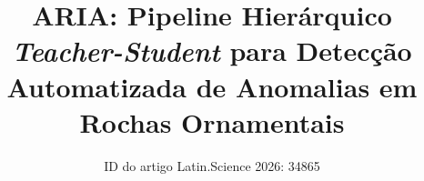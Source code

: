 \documentclass[10pt,conference]{IEEEtran}
\begin{document}
\title{ARIA: Pipeline Hierárquico \textit{Teacher-Student} para Detecção Automatizada de Anomalias em Rochas Ornamentais}

\newif\iffinal
\finalfalse
\newcommand{\blind}[2]{\iffinal#2\else#1\fi}
\newcommand{\cmtid}{34865}

\iffinal
\author{
\IEEEauthorblockN{Henrique Machado de Oliveira}
\IEEEauthorblockA{Instituto Federal do\\Espírito Santo (IFES)\\
Cachoeiro de Itapemirim, Brasil\\
rikemachado999@gmail.com}
\and
\IEEEauthorblockN{Rafael Silva Guimarães}
\IEEEauthorblockA{Instituto Federal do\\Espírito Santo (IFES)\\
Cachoeiro de Itapemirim, Brasil\\
rafaelg@ifes.edu.br}
\and
\IEEEauthorblockN{Everson Scherrer Borges}
\IEEEauthorblockA{Instituto Federal do\\Espírito Santo (IFES)\\
Cachoeiro de Itapemirim, Brasil\\
eversonborges@gmail.com}}
\else
  \author{ID do artigo Latin.Science 2026: \cmtid \\ }
\fi

\maketitle
\thispagestyle{fancy}
\end{document}
